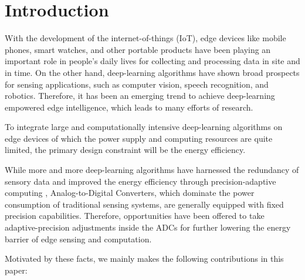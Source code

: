 \section{Introduction}

With the development of the internet-of-things (IoT), edge devices like mobile phones, smart watches, and other portable products have been playing an important role in people’s daily lives 
for collecting and processing data in site and in time. On the other hand, deep-learning algorithms have shown broad prospects for sensing applications, such as computer vision, speech recognition, 
and robotics. Therefore, it has been an emerging trend to achieve deep-learning empowered edge intelligence, which leads to many efforts of research. 

To integrate large and computationally intensive deep-learning algorithms on edge devices of which the power supply and computing resources are quite limited, the primary design constraint will be the energy efficiency.

While more and more deep-learning algorithms have harnessed the redundancy of sensory data and improved the energy efficiency through precision-adaptive computing \cite{leibe_xnor-net_2016}\cite{li_ternary_2016}\cite{park_energy-efficient_2018}, 
Analog-to-Digital Converters, which dominate the power consumption of 
traditional sensing systems, are generally equipped with fixed precision capabilities. Therefore, opportunities have been offered to take adaptive-precision adjustments inside the ADCs for further lowering the energy barrier of edge sensing and computation. 


Motivated by these facts, we mainly makes the following contributions in this paper:

